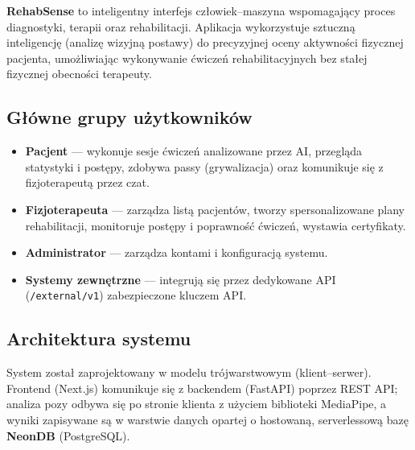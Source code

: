 \documentclass[11pt,a4paper]{article}
\newcommand{\sysname}{\textbf{RehabSense}}
\begin{document}
\sysname{} to inteligentny interfejs człowiek–maszyna wspomagający proces diagnostyki, terapii oraz rehabilitacji. Aplikacja wykorzystuje sztuczną inteligencję (analizę wizyjną postawy) do precyzyjnej oceny aktywności fizycznej pacjenta, umożliwiając wykonywanie ćwiczeń rehabilitacyjnych bez stałej fizycznej obecności terapeuty.

\subsection{Główne grupy użytkowników}
\begin{itemize}
  \item \textbf{Pacjent} — wykonuje sesje ćwiczeń analizowane przez AI, przegląda statystyki i postępy, zdobywa passy (grywalizacja) oraz komunikuje się z fizjoterapeutą przez czat.
  \item \textbf{Fizjoterapeuta} — zarządza listą pacjentów, tworzy spersonalizowane plany rehabilitacji, monitoruje postępy i poprawność ćwiczeń, wystawia certyfikaty.
  \item \textbf{Administrator} — zarządza kontami i konfiguracją systemu.
  \item \textbf{Systemy zewnętrzne} — integrują się przez dedykowane API (\texttt{/external/v1}) zabezpieczone kluczem API.
\end{itemize}

\subsection{Architektura systemu}
System został zaprojektowany w modelu trójwarstwowym (klient–serwer). Frontend (Next.js) komunikuje się z backendem (FastAPI) poprzez REST API; analiza pozy odbywa się po stronie klienta z użyciem biblioteki MediaPipe, a wyniki zapisywane są w warstwie danych opartej o hostowaną, serverlessową bazę \textbf{NeonDB} (PostgreSQL).
\end{document}
